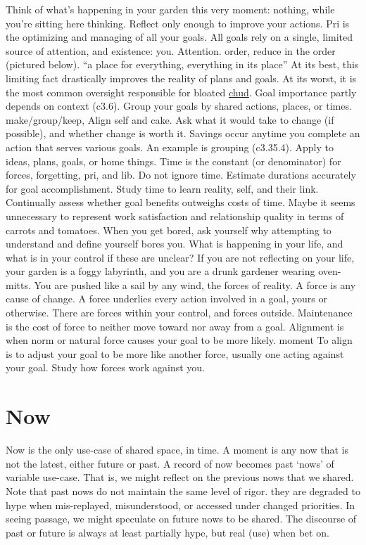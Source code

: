 \documentclass[
]{book}
\begin{document}
Think of what's happening in your garden this very moment: nothing, while you're sitting here thinking.
Reflect only enough to improve your actions.
Pri is the optimizing and managing of all your goals.
All goals rely on a single, limited source of attention, and existence: you.
Attention. order, reduce in the order (pictured below). ``a place for everything, everything in its place''
At its best, this limiting fact drastically improves the reality of plans and goals.
At its worst, it is the most common oversight responsible for bloated \protect\hyperlink{c.h.u.d.}{chud}.
Goal importance partly depends on context (c3.6).
Group your goals by shared actions, places, or times. make/group/keep,
Align self and cake.
Ask what it would take to change (if possible), and whether change is worth it.
Savings occur anytime you complete an action that serves various goals.
An example is grouping (c3.35.4).
Apply to ideas, plans, goals, or home things.
Time is the constant (or denominator) for forces, forgetting, pri, and lib.
Do not ignore time.
Estimate durations accurately for goal accomplishment.
Study time to learn reality, self, and their link.
Continually assess whether goal benefits outweighs costs of time.
Maybe it seems unnecessary to represent work satisfaction and relationship quality in terms of carrots and tomatoes.
When you get bored, ask yourself why attempting to understand and define yourself bores you.
What is happening in your life, and what is in your control if these are unclear?
If you are not reflecting on your life, your garden is a foggy labyrinth, and you are a drunk gardener wearing oven-mitts.
You are pushed like a sail by any wind, the forces of reality.
A force is any cause of change.
A force underlies every action involved in a goal, yours or otherwise.
There are forces within your control, and forces outside.
Maintenance is the cost of force to neither move toward nor away from a goal.
Alignment is when norm or natural force causes your goal to be more likely. moment
To align is to adjust your goal to be more like another force, usually one acting against your goal.
Study how forces work against you.

\hypertarget{now}{%
\section{Now}\label{now}}

Now is the only use-case of shared space, in time.
A moment is any now that is not the latest, either future or past.
A record of now becomes past `nows' of variable use-case.
That is, we might reflect on the previous nows that we shared.
Note that past nows do not maintain the same level of rigor. they are degraded to hype when mis-replayed, misunderstood, or accessed under changed priorities.
In seeing passage, we might speculate on future nows to be shared.
The discourse of past or future is always at least partially hype, but real (use) when bet on.
\end{document}

